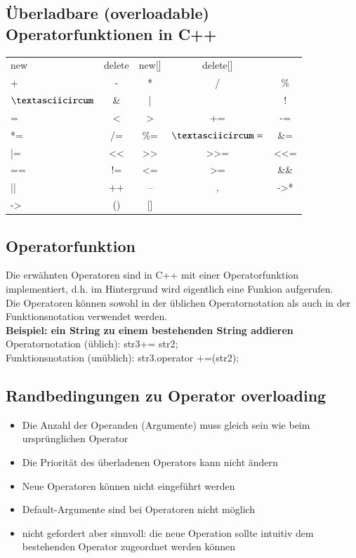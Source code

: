 \begin{multicols}{2}
\subsection{Überladbare (overloadable) Operatorfunktionen in C++}
\begin{tabular}{|l|c|c|c|c|}
	\hline 
	new & delete & new[] & delete[] &  \\ 
	+ & - & * & / & \% \\ 
	\hline 
	$\textasciicircum$ & \& & | & ~ & ! \\ 
	\hline 
	= & < & > & += & -= \\ 
	\hline 
	*= & /= & \%= & $\textasciicircum=$ & \&= \\ 
	\hline 
	|= & << & >> & >>= & <<= \\ 
	\hline 
	== & != & <= & >= & \&\& \\ 
	\hline 
	|| & ++ & -- & , & ->* \\ 
	\hline 
	-> & () & [] &  &  \\ 
	\hline 
\end{tabular}
\vfill\null
\columnbreak
\subsection{Operatorfunktion}
Die erwähnten Operatoren sind in C++ mit einer Operatorfunktion implementiert, d.h. im Hintergrund wird eigentlich eine Funkion aufgerufen.\\
Die Operatoren können sowohl in der üblichen Operatornotation als auch in der Funktionsnotation verwendet werden.\\
\textbf{Beispiel: ein String zu einem bestehenden String addieren}\\
\vspace{\baselineskip}
Operatornotation (üblich): str3+= str2;\\
\vspace{\baselineskip}
Funktionsnotation (unüblich): str3.operator +=(str2);
\end{multicols}

\subsection{Randbedingungen zu Operator overloading}
\begin{itemize}
	\item Die Anzahl der Operanden (Argumente) muss gleich sein wie beim ursprünglichen Operator
	\item Die Priorität des überladenen Operators kann nicht ändern
	\item Neue Operatoren können nicht eingeführt werden
	\item Default-Argumente sind bei Operatoren nicht möglich
	\item nicht gefordert aber sinnvoll: die neue Operation sollte intuitiv dem bestehenden Operator zugeordnet werden können
\end{itemize}

